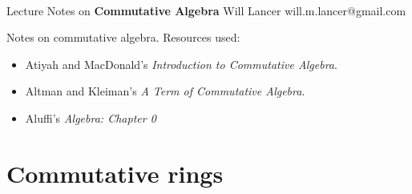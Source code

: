 \documentclass[11pt]{article}
\begin{document}
\thispagestyle{empty}
\bigskip \
\vspace{0.1cm}

\begin{center}
{\fontsize{22}{22} \selectfont Lecture Notes on}
\vskip 16pt
{\fontsize{36}{36} \selectfont \bf \sffamily Commutative Algebra}
\vskip 24pt
{\fontsize{18}{18} \selectfont \rmfamily Will Lancer} 
\vskip 6pt
{\fontsize{14}{14} \selectfont \ttfamily will.m.lancer@gmail.com} 
\vskip 24pt
\end{center}

{\parindent0pt \baselineskip=15.5pt}
\noin
Notes on commutative algebra. Resources used:
\begin{itemize}
    \item Atiyah and MacDonald's \emph{Introduction to Commutative Algebra}.
    \item Altman and Kleiman's \emph{A Term of Commutative Algebra}.
    \item Aluffi's \emph{Algebra: Chapter 0}
\end{itemize}

\newpage
\microtoc
\newpage

\section{Commutative rings}
\end{document}
